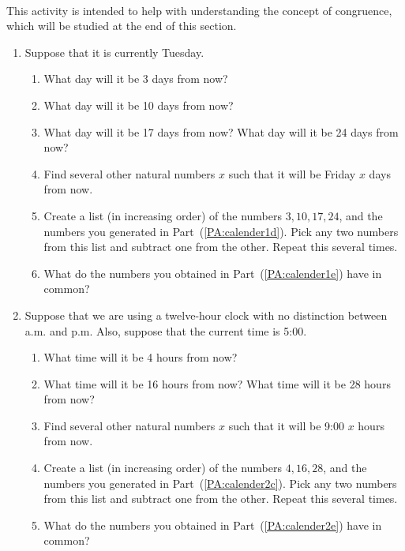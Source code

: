 \begin{previewactivity}\label{PA:calender} \hfill \\
This activity is intended to help with understanding the concept of congruence, which will be studied at the end of this section.
\begin{enumerate}
  \item Suppose that it is currently Tuesday.
\label{PA:calender1}%
  \begin{enumerate}
    \item What day will it be 3 days from now?
    \item What day will it be 10 days from now?
    \item What day will it be 17 days from now?  What day will it be 24 days from now?
    \item Find several other natural numbers  $x$  such that it will be Friday  $x$  days from now.
\label{PA:calender1d}%
    \item Create a list (in increasing order) of the numbers $3, 10, 17, 24$, and the numbers you generated in Part~(\ref{PA:calender1d}).  Pick any two numbers from this list and subtract one from the other. Repeat this several times.
\label{PA:calender1e}%
    \item What do the numbers you obtained in Part~(\ref{PA:calender1e}) have in common?
  \end{enumerate}

  \item Suppose that we are using a twelve-hour clock with no distinction between {\smallc a.m.} and {\smallc p.m.}  Also, suppose that the current time is 5:00.
  \begin{enumerate}
    \item What time will it be  4 hours from now?
    \item What time will it be 16 hours from now?  What time will it be 28 hours from now?
    \item Find several other natural numbers  $x$  such that it will be 9:00  $x$  hours from now.
\label{PA:calender2c}%
    \item Create a list (in increasing order) of the numbers $4, 16, 28$, and the numbers you generated in Part~(\ref{PA:calender2c}).  Pick any two numbers from this list and subtract one from the other. Repeat this several times.
\label{PA:calender2e}%
    \item What do the numbers you obtained in Part~(\ref{PA:calender2e}) have in common? 
  \end{enumerate}


\end{enumerate}
\end{previewactivity}
